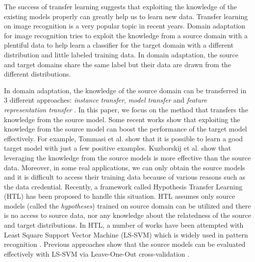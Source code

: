 The success of transfer learning suggests that exploiting the knowledge of the existing models properly can greatly help us to learn new data. 
Transfer learning on image recognition is a very popular topic in recent years. Domain adaptation for image recognition tries to exploit the knowledge from a source domain with a plentiful data to help learn a classifier for the target domain with a different distribution and little labeled training data. In domain adaptation, the source and target domains share the same label but their data are drawn from the different distributions.

In domain adaptation, the knowledge of the source domain can be transferred in 3 different approaches: \textit{instance transfer}, \textit{model transfer} and \textit{feature representation transfer} \cite{pan2010survey}. In this paper, we focus on the method that transfers the knowledge from the source model. Some recent works show that exploiting the knowledge from the source model can boost the performance of the target model effectively. For example, Tommasi et al. \cite{tommasi2014learning} show that it is possible to learn a good target model with just a few positive examples. Kuzborskij et al. \cite{kuzborskij2013n} show that leveraging the knowledge from the source models is more effective than the source data.
Moreover, in some real applications, we can only obtain the source models and it is difficult to access their training data because of various reasons such as the data credential.   
Recently, a framework called Hypothesis Transfer Learning (HTL) \cite{kuzborskij2013stability} has been proposed to handle this situation. HTL assumes only source models (called the \textit{hypotheses}) trained on source domain can be utilized and there is no access to source data, nor any knowledge about the relatedness of the source and target distributions. 
In HTL, a number of works \cite{kuzborskij2013n} \cite{jie2011multiclass} have been attempted with Least Square Support Vector Machine (LS-SVM) \cite{suykens1999least} which is widely used in pattern recognition \cite{bishop2006pattern}. Previous approaches show that the source models can be evaluated effectively with LS-SVM via Leave-One-Out cross-validation \cite{tommasi2014learning}.

